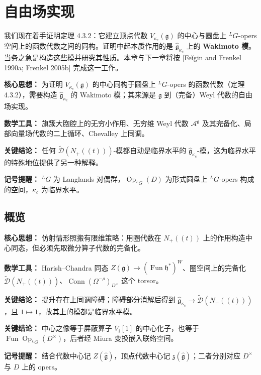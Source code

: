 
\chapter{自由场实现}

我们现在着手证明定理 4.3.2：它建立顶点代数 $V_{\kappa_c}(\mathfrak{g})$ 的中心与圆盘上 ${}^LG$-opers 空间上的函数代数之间的同构。证明中起本质作用的是 $\hat{\mathfrak{g}}_{\kappa_c}$ 上的 \textbf{Wakimoto 模}。当务之急是构造这些模并研究其性质。本章与下一章将按 [Feĭgin and Frenkel 1990a; Frenkel 2005b] 完成这一工作。

\begin{keypoints}
    \item \textbf{核心思想：} 为证明 $V_{\kappa_c}(\mathfrak{g})$ 的中心同构于圆盘上 ${}^LG$-opers 的函数代数（定理 4.3.2），需要构造 $\hat{\mathfrak{g}}_{\kappa_c}$ 的 Wakimoto 模；其来源是 $\mathfrak{g}$ 到（完备）Weyl 代数的自由场实现。
    \item \textbf{数学工具：} 旗簇大胞腔上的无穷小作用、无穷维 Weyl 代数 $\mathcal{A}^{\mathfrak{g}}$ 及其完备化、局部向量场代数的二上循环、Chevalley 上同调。
    \item \textbf{关键结论：} 任何 $\widetilde{\mathcal{D}}(N_+((t)))$-模都自动是临界水平的 $\hat{\mathfrak{g}}_{\kappa_c}$-模，这为临界水平的特殊地位提供了另一种解释。
    \item \textbf{记号提醒：} ${}^LG$ 为 Langlands 对偶群，$\operatorname{Op}_{{}^LG}(D)$ 为形式圆盘上 ${}^LG$-opers 构成的空间，$\kappa_c$ 为临界水平。
\end{keypoints}

\section{概览}

\begin{keypoints}
    \item \textbf{核心思想：} 仿射情形照搬有限维策略：用圈代数在 $N_+((t))$ 上的作用构造中心同态，但必须先取微分算子代数的完备化。
    \item \textbf{数学工具：} Harish--Chandra 同态 $Z(\mathfrak{g})\to(\operatorname{Fun}\mathfrak{h}^*)^W$、圈空间上的完备化 $\widetilde{\mathcal{D}}(N_+((t)))$、$\operatorname{Conn}(\Omega^{-\rho})_{D^\times}$ 这个 torsor。
    \item \textbf{关键结论：} 提升存在上同调障碍；障碍部分消解后得到 $\hat{\mathfrak{g}}_{\kappa_c}\to\widetilde{\mathcal{D}}(N_+((t)))$，且 $1\mapsto1$，故其上的模都是临界水平模。
    \item \textbf{关键结论：} 中心之像等于屏蔽算子 $\overline{V}_i[1]$ 的中心化子，也等于 $\operatorname{Fun}\operatorname{Op}_{{}^LG}(D^\times)$，后者经 Miura 变换嵌入联络空间。
    \item \textbf{记号提醒：} 结合代数中心记 $Z(\hat{\mathfrak{g}})$，顶点代数中心记 $\mathfrak{z}(\hat{\mathfrak{g}})$；二者分别对应 $D^\times$ 与 $D$ 上的 opers。
\end{keypoints}

